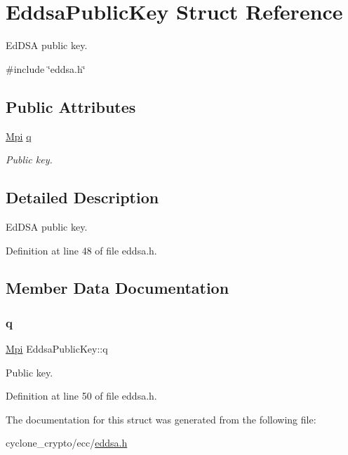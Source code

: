 \hypertarget{structEddsaPublicKey}{}\section{Eddsa\+Public\+Key Struct Reference}
\label{structEddsaPublicKey}


Ed\+D\+SA public key.  




{\ttfamily \#include \char`\"{}eddsa.\+h\char`\"{}}

\subsection*{Public Attributes}
\begin{DoxyCompactItemize}
\item 
\hyperlink{structMpi}{Mpi} \hyperlink{structEddsaPublicKey_ad64b6fac961042422df3f17bd5f01f9e}{q}
\begin{DoxyCompactList}\small\item\em Public key. \end{DoxyCompactList}\end{DoxyCompactItemize}


\subsection{Detailed Description}
Ed\+D\+SA public key. 

Definition at line 48 of file eddsa.\+h.



\subsection{Member Data Documentation}
\mbox{\label{structEddsaPublicKey_ad64b6fac961042422df3f17bd5f01f9e}} 
\subsubsection{\texorpdfstring{q}{q}}
{\footnotesize\ttfamily \hyperlink{structMpi}{Mpi} Eddsa\+Public\+Key\+::q}



Public key. 



Definition at line 50 of file eddsa.\+h.



The documentation for this struct was generated from the following file\+:\begin{DoxyCompactItemize}
\item 
cyclone\+\_\+crypto/ecc/\hyperlink{eddsa_8h}{eddsa.\+h}\end{DoxyCompactItemize}
